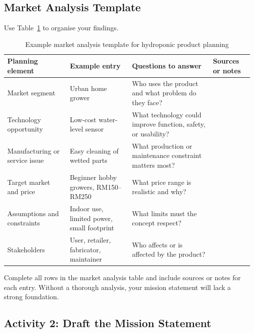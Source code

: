 \subsection{Market Analysis Template}

Use Table~\ref{tab:session56-market-analysis} to organise your findings.

\begin{table}[H]
\centering
\caption{Example market analysis template for hydroponic product planning}
\label{tab:session56-market-analysis}
\renewcommand{\arraystretch}{1.2}
\begin{tabularx}{\textwidth}{|>{\raggedright\arraybackslash}p{}|>{\raggedright\arraybackslash}p{}|>{\raggedright\arraybackslash}X|>{\raggedright\arraybackslash}p{}|}
\hline
\textbf{Planning element} & \textbf{Example entry} & \textbf{Questions to answer} & \textbf{Sources or notes} \\
\hline
Market segment & Urban home grower & Who uses the product and what problem do they face? &  \\
\hline
Technology opportunity & Low-cost water-level sensor & What technology could improve function, safety, or usability? &  \\
\hline
Manufacturing or service issue & Easy cleaning of wetted parts & What production or maintenance constraint matters most? &  \\
\hline
Target market and price & Beginner hobby growers, RM150--RM250 & What price range is realistic and why? &  \\
\hline
Assumptions and constraints & Indoor use, limited power, small footprint & What limits must the concept respect? &  \\
\hline
Stakeholders & User, retailer, fabricator, maintainer & Who affects or is affected by the product? &  \\
\hline
\end{tabularx}
\end{table}

\begin{tcolorbox}[title=Checkpoint]
Complete all rows in the market analysis table and include sources or notes for each entry. Without a thorough analysis, your mission statement will lack a strong foundation.
\end{tcolorbox}

\subsection{Activity 2: Draft the Mission Statement}

